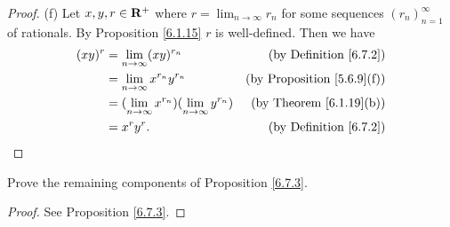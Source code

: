 \begin{proof}{(f)}
    Let \(x, y, r \in \mathbf{R}^+\) where \(r = \lim_{n \to \infty} r_n\) for some sequences \((r_n)_{n = 1}^\infty\) of rationals.
    By Proposition \ref{6.1.15} \(r\) is well-defined.
    Then we have
    \begin{align*}
        (xy)^r & = \lim_{n \to \infty} (xy)^{r_n}                             & \text{(by Definition \ref{6.7.2})}     \\
               & = \lim_{n \to \infty} x^{r_n} y^{r_n}                        & \text{(by Proposition \ref{5.6.9}(f))} \\
               & = (\lim_{n \to \infty} x^{r_n})(\lim_{n \to \infty} y^{r_n}) & \text{(by Theorem \ref{6.1.19}(b))}    \\
               & = x^r y^r.                                                   & \text{(by Definition \ref{6.7.2})}
    \end{align*}
\end{proof}

\exercisesection

\begin{exercise}\label{ex 6.7.1}
    Prove the remaining components of Proposition \ref{6.7.3}.
\end{exercise}

\begin{proof}
    See Proposition \ref{6.7.3}.
\end{proof}